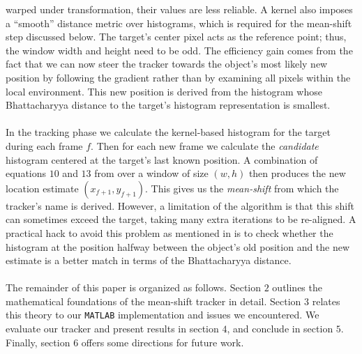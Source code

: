 \documentclass[a4paper,11pt]{article}
\begin{document}
		warped under transformation, their values are less reliable. A kernel
		also imposes a ``smooth'' distance metric over histograms, which is
		required for the mean-shift step discussed below. The target's center
		pixel acts as the reference point; thus, the window width and height
		need to be odd. The efficiency gain comes from the fact that we can
		now steer the tracker towards the object's most likely new position
		by following the gradient rather than by examining all pixels within
		the local environment. This new position is derived from the histogram
		whose Bhattacharyya distance to the target's histogram representation
		is smallest.
		\\ \\
		In the tracking phase we calculate the kernel-based histogram for the target during
		each frame $f$. Then for each new frame we calculate the \textit{candidate} histogram
		centered at the target's last known position. A combination of equations $10$ and $13$
		from \cite{KBOT} over a window of size $(w, h)$ then produces the new location estimate
		$(x_{f+1}, y_{f+1})$. This gives us the \textit{mean-shift} from which the tracker's name
		is derived. However, a limitation of the algorithm is that this shift can sometimes exceed
		the target, taking many extra iterations to be re-aligned. A practical hack to avoid this
		problem as mentioned in \cite{KBOT} is to check whether the histogram at the position halfway
		between the object's old position and the new estimate is a better match in terms of the
		Bhattacharyya distance.
		\\ \\
		The remainder of this paper is organized as follows. Section $2$ outlines the mathematical
		foundations of the mean-shift tracker in detail. Section $3$ relates this theory to our
		\verb|MATLAB| implementation and issues we encountered. We evaluate our tracker and present
		results in section $4$, and conclude in section $5$. Finally, section $6$ offers some directions
		for future work.
\end{document}
